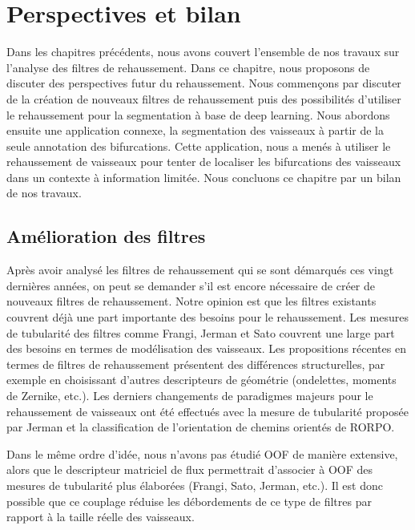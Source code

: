 \chapter{Perspectives et bilan}
\label{sec:Ending}

Dans les chapitres précédents, nous avons couvert l'ensemble de nos travaux sur l'analyse des filtres de rehaussement. Dans ce chapitre, nous proposons de discuter des perspectives futur du rehaussement. Nous commençons par discuter de la création de nouveaux filtres de rehaussement puis des possibilités d'utiliser le rehaussement pour la segmentation à base de deep learning. Nous abordons ensuite une application connexe, la segmentation des vaisseaux à partir de la seule annotation des bifurcations. Cette application, nous a menés à utiliser le rehaussement de vaisseaux pour tenter de localiser les bifurcations des vaisseaux dans un contexte à information limitée. Nous concluons ce chapitre par un bilan de nos travaux.
 
\section{Amélioration des filtres}

Après avoir analysé les filtres de rehaussement qui se sont démarqués ces vingt dernières années, on peut se demander s'il est encore nécessaire de créer de nouveaux filtres de rehaussement. Notre opinion est que les filtres existants couvrent déjà une part importante des besoins pour le rehaussement. Les mesures de tubularité des filtres comme Frangi, Jerman et Sato couvrent une large part des besoins en termes de modélisation des vaisseaux. Les propositions récentes en termes de filtres de rehaussement présentent des différences structurelles, par exemple en choisissant d'autres descripteurs de géométrie (ondelettes, moments de Zernike, etc.). Les derniers changements de paradigmes majeurs pour le rehaussement de vaisseaux ont été effectués avec la mesure de tubularité proposée par Jerman et la classification de l'orientation de chemins orientés de RORPO.

Dans le même ordre d'idée, nous n'avons pas étudié OOF de manière extensive, alors que le descripteur matriciel de flux permettrait d'associer à OOF des mesures de tubularité plus élaborées (Frangi, Sato, Jerman, etc.). Il est donc possible que ce couplage réduise les débordements de ce type de filtres par rapport à la taille réelle des vaisseaux.

